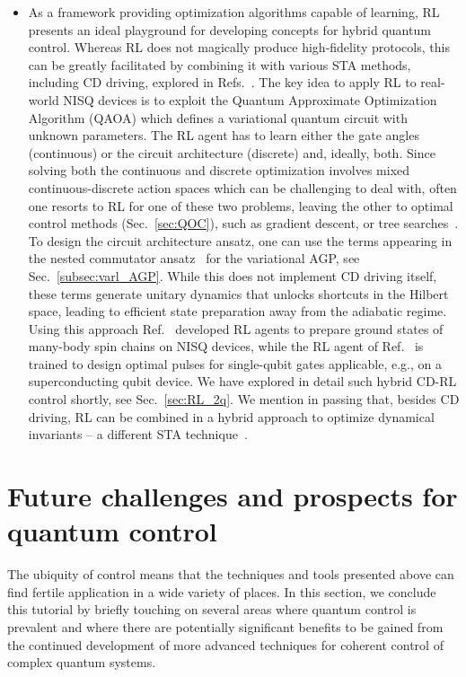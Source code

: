 \begin{itemize}
\item As a framework providing optimization algorithms capable of learning, RL presents an ideal playground for developing concepts for hybrid quantum control. Whereas RL does not magically produce high-fidelity protocols, this can be greatly facilitated by combining it with various STA methods, including CD driving, explored in Refs.~\cite{yao2021reinforcement,XiChenRL1}. The key idea to apply RL to real-world NISQ devices is to exploit the Quantum Approximate Optimization Algorithm (QAOA) which defines a variational quantum circuit with unknown parameters. The RL agent has to learn either the gate angles (continuous) or the circuit architecture (discrete) and, ideally, both. Since solving both the continuous and discrete optimization involves mixed continuous-discrete action spaces which can be challenging to deal with, often one resorts to RL for one of these two problems, leaving the other to optimal control methods (Sec.~\ref{sec:QOC}), such as gradient descent, or tree searches~\cite{yao2022monte}. To design the circuit architecture ansatz, one can use the terms appearing in the nested commutator ansatz~\cite{Claeys2019Floquet} for the variational AGP, see Sec.~\ref{subsec:varl_AGP}. While this does not implement CD driving itself, these terms generate unitary dynamics that unlocks shortcuts in the Hilbert space, leading to efficient state preparation away from the adiabatic regime. 
Using this approach Ref.~\cite{yao2021reinforcement} developed RL agents to prepare ground states of many-body spin chains on NISQ devices, while the RL agent of Ref.~\cite{XiChenRL1} is trained to design optimal pulses for single-qubit gates applicable, e.g., on a superconducting qubit device. 
We have explored in detail such hybrid CD-RL control shortly, see Sec.~\ref{sec:RL_2q}.
We mention in passing that, besides CD driving, RL can be combined in a hybrid approach to optimize dynamical invariants -- a different STA technique~\cite{XiChenRL3}.
\end{itemize}

\clearpage

\section{Future challenges and prospects for quantum control}
\label{sec:Outlook}

The ubiquity of control means that the techniques and tools presented above can find fertile application in a wide variety of places. In this section, we conclude this tutorial by briefly touching on several areas where quantum control is prevalent and where there are potentially significant benefits to be gained from the continued development of more advanced techniques for coherent control of complex quantum systems.\\

